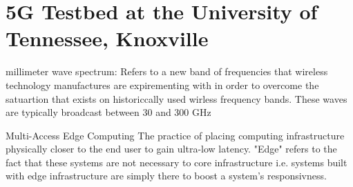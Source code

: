 \documentclass{article}
\begin{document}
\section*{5G Testbed at the University of Tennessee, Knoxville}


millimeter wave spectrum: Refers to a new band of frequencies that wireless
technology manufactures are expirementing with in order to overcome the satuartion
that exists on historiccally used wirless frequency bands. These waves are 
typically broadcast between 30 and 300 GHz


Multi-Access Edge Computing
The practice of placing computing infrastructure physically closer to the end user to 
gain ultra-low latency. "Edge" refers to the fact that these systems are not necessary
to core infrastructure i.e. systems built with edge infrastructure are simply there to
boost a system's responsivness.
\end{document}
